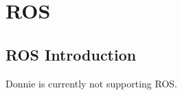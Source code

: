 \chapter{ROS}

\section{ROS Introduction}
\label{sec:ros_intro}

Donnie is currently not supporting ROS. 


